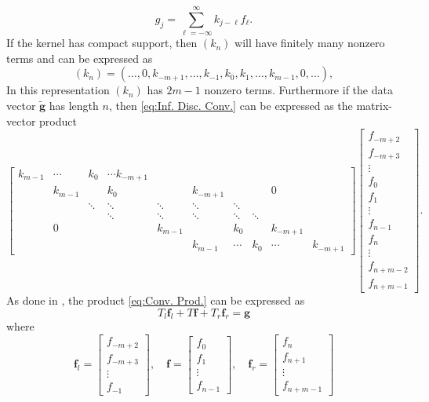 \documentclass[12pt]{book}
\newcommand{\gVec}{\mathbf{g}}	%
\newcommand{\gnoiseVec}{\widetilde{\mathbf{g}}}	%
\newcommand{\fVec}{\mathbf{f}}	%
\begin{document}
\begin{equation}
\label{eq:Inf. Disc. Conv.}
g_j = \sum_{\ell=-\infty}^{\infty} k_{j-\ell}f_{\ell}.
\end{equation}
If the kernel has compact support, then $(k_n)$ will have finitely many nonzero terms and can be expressed as
\begin{equation}
\label{eq:Kernel seq.}
(k_n) = (\ldots,0,k_{-m+1},\ldots,k_{-1},k_{0},k_{1},\ldots,k_{m-1},0,\ldots),
\end{equation}
In this representation $(k_n)$ has $2m-1$ nonzero terms. Furthermore if the data vector $\gnoiseVec$ has length $n$, then \eqref{eq:Inf. Disc. Conv.} can be expressed as the matrix-vector product
\begin{equation}
\label{eq:Conv. Prod.}
\begin{bmatrix}
k_{m-1} & \cdots & k_0 & \cdots k_{-m+1} & & & & & \\
 & k_{m-1} & & k_0 & & k_{-m+1} & & & 0 & \\
 & & \ddots & \ddots & \ddots & \ddots & \ddots & & & \\
 & & & \ddots & \ddots & \ddots & \ddots & \ddots & & \\
 & 0 & & & k_{m-1} & & k_0 & & k_{-m+1} & \\
 & & & & & k_{m-1} & \cdots & k_0 & \cdots & k_{-m+1}
\end{bmatrix}\begin{bmatrix}
f_{-m+2} \\
f_{-m+3} \\
\vdots \\
f_0 \\
f_1 \\
\vdots \\
f_{n-1} \\
f_n \\
\vdots \\
f_{n+m-2} \\
f_{n+m-1}
\end{bmatrix}.
\end{equation}
As done in \cite{NeumannDCT}, the product \eqref{eq:Conv. Prod.} can be expressed as
\begin{equation}
\label{eq: Tf = g}
T_{l}\fVec_{l} + T\fVec + T_{r}\fVec_{r} = \gVec
\end{equation}
where
\[\fVec_{l} = \begin{bmatrix}
f_{-m+2} \\
f_{-m+3} \\
\vdots \\
f_{-1}
\end{bmatrix}, \quad \fVec = \begin{bmatrix}
f_{0} \\
f_{1} \\
\vdots \\
f_{n-1}
\end{bmatrix}, \quad \fVec_{r} = \begin{bmatrix}
f_{n} \\
f_{n+1} \\
\vdots \\
f_{n+m-1}
\end{bmatrix}\]
\end{document}
